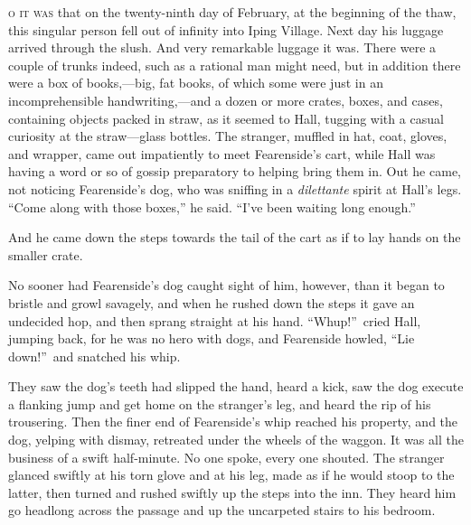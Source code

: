 \label{ch:03}
\begin{ChapterStart}
\vspace*{2\nbs}

\vspace{1.5\nbs}
\vspace{0.75\nbs}
\end{ChapterStart}

\kern-5pt\textsc{o it was} that on the twenty-ninth day of February, at the beginning of the thaw, this singular person fell out of infinity into Iping Village. Next day his luggage arrived through the slush. And very remarkable luggage it was. There were a couple of trunks indeed, such as a rational man might need, but in addition there were a box of books,—big, fat books, of which some were just in an incomprehensible handwriting,—and a dozen or more crates, boxes, and cases, containing objects packed in straw, as it seemed to Hall, tugging with a casual curiosity at the straw—glass bottles. The stranger, muffled in hat, coat, gloves, and wrapper, came out impatiently to meet Fearenside’s cart, while Hall was having a word or so of gossip preparatory to helping bring them in. Out he came, not noticing Fearenside’s dog, who was sniffing in a \emph{dilettante} spirit at Hall’s legs. “Come along with those boxes,” he said. “I’ve been waiting long enough.”

And he came down the steps towards the tail of the cart as if to lay hands on the smaller crate.

No sooner had Fearenside’s dog caught sight of him, however, than it began to bristle and growl savagely, and when he rushed down the steps it gave an undecided hop, and then sprang straight at his hand. “Whup!”\ cried Hall, jumping back, for he was no hero with dogs, and Fearenside howled, “Lie down!”\ and snatched his whip.

They saw the dog’s teeth had slipped the hand, heard a kick, saw the dog execute a flanking jump and get home on the stranger’s leg, and heard the rip of his trousering. Then the finer end of Fearenside’s whip reached his property, and the dog, yelping with dismay, retreated under the wheels of the waggon. It was all the business of a swift half-minute. No one spoke, every one shouted. The stranger glanced swiftly at his torn glove and at his leg, made as if he would stoop to the latter, then turned and rushed swiftly up the steps into the inn. They heard him go headlong across the passage and up the uncarpeted stairs to his bedroom.

